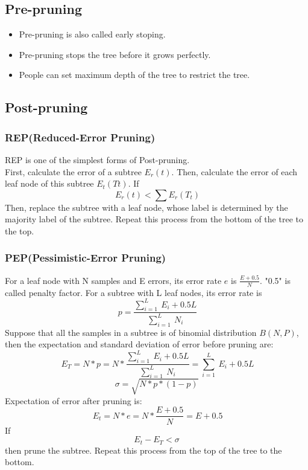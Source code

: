 \documentclass[50pt]{article}
\begin{document}
\subsection{Pre-pruning}
\begin{itemize}
    \item Pre-pruning is also called early stoping.
    \item Pre-pruning stops the tree before it grows perfectly.
    \item People can set maximum depth of the tree to restrict the tree.
\end{itemize}
\subsection{Post-pruning}
\subsubsection{REP(Reduced-Error Pruning)}
REP is one of the simplest forms of Post-pruning.\\
First, calculate the error of a subtree $E_{r}(t)$.
Then, calculate the error of each leaf node of this subtree $E_{t}(Tt)$.
If $$\ E_{r}(t) < \sum E_{r}(T_{t})$$
Then, replace the subtree with a leaf node, whose label is determined by the majority label of the subtree. Repeat this process from the bottom of the tree to the top.
\subsubsection{PEP(Pessimistic-Error Pruning)}
For a leaf node with N samples and E errors, its error rate $e$ is $\frac{E+0.5}{N}$. "0.5" is called penalty factor. For a subtree with L leaf nodes, its error rate is 
$$ \ p = \frac{\sum_{i=1}^{L}\ E_{i}+0.5L}{\sum_{i=1}^{L}\ N_{i}}$$
Suppose that all the samples in a subtree is of binomial distribution $B(N,P)$, then the expectation and standard deviation of error before pruning are:
$$\ E_{T} = N*p = N*\frac{\sum_{i=1}^{L}\ E_{i}+0.5L}{\sum_{i=1}^{L}\ N_{i}} = \sum_{i=1}^{L}\ E_{i}+0.5L $$
$$\sigma = \sqrt{N*p*(1-p)}$$
Expectation of error after pruning is:
$$\ E_{t} = N*e = N*\frac{E+0.5}{N} = E+0.5$$
If $$E_{t} - E_{T} < \sigma$$
then prune the subtree. Repeat this process from the top of the tree to the bottom.
\end{document}
